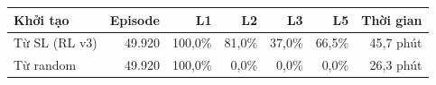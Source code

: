 \begin{center}\small
\begin{tabular}{@{}lrrrrrr@{}}
\toprule
Khởi tạo & Episode & L1 & L2 & L3 & L5 & Thời gian \\
\midrule
Từ SL (RL v3) & 49.920 & 100,0\% & 81,0\% & 37,0\% & 66,5\% & 45,7 phút \\
Từ random & 49.920 & 100,0\% & 0,0\% & 0,0\% & 0,0\% & 26,3 phút \\
\bottomrule
\end{tabular}
\end{center}